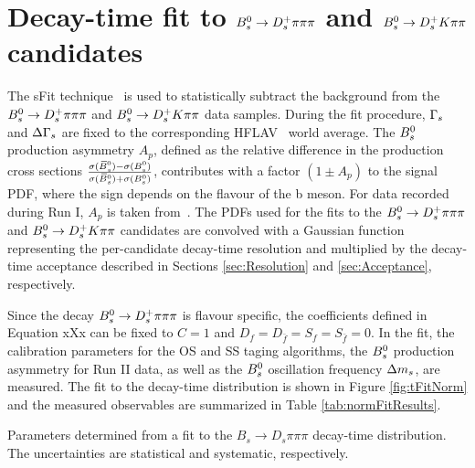 \section{Decay-time fit to ${{B}^0_{s}}\rightarrow{\ensuremath{{D}^+_{s}}}{\ensuremath{\pi}}{\ensuremath{\pi}}{\ensuremath{\pi}}$ and ${{B}^0_{s}}\rightarrow{\ensuremath{{D}^+_{s}}}{\ensuremath{K}}{\ensuremath{\pi}}{\ensuremath{\pi}}$ candidates}
\label{sec:timeFit}

The sFit technique~\cite{Pivk:2004ty} is used to statistically subtract the background from the ${{B}^0_{s}}\rightarrow{\ensuremath{{D}^+_{s}}}{\ensuremath{\pi}}{\ensuremath{\pi}}{\ensuremath{\pi}}$ and ${{B}^0_{s}}\rightarrow{\ensuremath{{D}^+_{s}}}{\ensuremath{K}}{\ensuremath{\pi}}{\ensuremath{\pi}}$ data samples. 
During the fit procedure, ${\Gamma_{{s}}}$ and ${\Delta\Gamma_{{s}}}$ are fixed to the corresponding HFLAV~\cite{HFAG} world average.
The ${{B}^0_{s}}$ production asymmetry $A_{p}$, defined as the relative difference in the production cross sections $\frac{\sigma({{\kern 0.18em\overline{\kern -0.18em B}{}}{}^0_{s}}) - \sigma({{B}^0_{s}})}{\sigma({{\kern 0.18em\overline{\kern -0.18em B}{}}{}^0_{s}}) + \sigma({{B}^0_{s}})}$, contributes with a factor $(1 \pm A_{p})$ to the signal PDF,
where the sign depends on the flavour of the b meson. 
For data recorded during Run I, $A_{p}$ is taken from~\cite{Aaij:2017mso}.
The PDFs used for the fits to the ${{B}^0_{s}}\rightarrow{\ensuremath{{D}^+_{s}}}{\ensuremath{\pi}}{\ensuremath{\pi}}{\ensuremath{\pi}}$ and ${{B}^0_{s}}\rightarrow{\ensuremath{{D}^+_{s}}}{\ensuremath{K}}{\ensuremath{\pi}}{\ensuremath{\pi}}$ candidates are convolved with a Gaussian function representing the per-candidate decay-time resolution 
and multiplied by the decay-time acceptance described in Sections \ref{sec:Resolution} and \ref{sec:Acceptance}, respectively.\newline

Since the decay ${{B}^0_{s}}\rightarrow{\ensuremath{{D}^+_{s}}}{\ensuremath{\pi}}{\ensuremath{\pi}}{\ensuremath{\pi}}$ is flavour specific, the \CP coefficients defined in Equation xXx can be fixed to $C=1$ and $D_{f} = D_{\bar{f}} = S_{f} = S_{\bar{f}} = 0$. 
In the fit, the calibration parameters for the OS and SS taging algorithms, the ${{B}^0_{s}}$ production asymmetry for Run II data, as well as the ${{B}^0_{s}}$ oscillation frequency ${\Delta m_{{s}}}$, are measured.  
The fit to the decay-time distribution is shown in Figure \ref{fig:tFitNorm} and the measured observables are summarized in Table \ref{tab:normFitResults}. 

\begin{table}[h]
\centering
\footnotesize
\caption{\small Parameters determined from a fit to the $B_s \to D_s \pi \pi\pi$ decay-time distribution. The uncertainties are statistical and systematic, respectively.}
        \renewcommand{\arraystretch}{1.25}
        
\label{tab:normFitResults}
\end{table}


